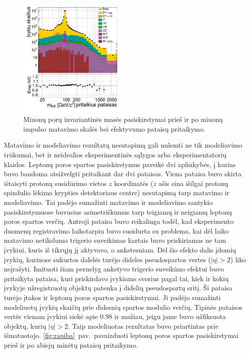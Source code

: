 \documentclass[a4paper, 12pt, oneside]{article}
\begin{document}
\begin{figure}[b!]
	\includegraphics[width=0.48\textwidth]{Kursinis3/mumu_mass_afterSF.png}
	\vspace{-0.5cm}
	\caption{\label{fig:invMba} Miuonų porų invariantinės masės pasiskirstymai prieš ir po miuonų impulso matavimo skalės
	bei efektyvumo pataisų pritaikymo.}
\end{figure}

Matavimo ir modeliavimo rezultatų nesutapimą gali nulemti ne tik modeliavimo trūkumai, bet ir neidealios eksperimentinės sąlygos
arba eksperimentatorių klaidos.
Leptonų poros spartos pasiskirstymus paveikė dvi aplinkybės, į kurias buvo bandoma atsižvelgti pritaikant dar dvi pataisas.
Viena pataisa buvo skirta ištaisyti protonų susidūrimo vietos $z$ koordinatės ($z$ ašis eina išilgai protonų
spindulio lėkimo krypties detektoriaus centre) nesutapimą tarp matavimo ir modeliavimo.
Tai padėjo sumažinti matavimo ir modeliavimo santykio pasiskirstymuose buvusius asimetriškumus tarp teigiamų ir neigiamų leptonų
poros spartos verčių.
Antroji pataisa buvo reikalinga todėl, kad eksperimento duomenų registravimo laikotarpiu buvo susidurta su problema,
kai dėl laiko matavimo netikslumo trigerio suveikimas kartais buvo priskiriamas ne tam įvykiui, kuris iš tikrųjų jį aktyvavo, o
ankstesniam.
Dėl šio efekto dalis įdomių įvykių, kuriuose sukurtos dalelės turėjo dideles pseudospartos vertes ($|\eta|>2$) liko neįrašyti.
Imituoti šiam pernelyg ankstyvo trigerio suveikimo efektui buvo pritaikyta pataisa, kuri priskirdavo įvykiams
svorius pagal tai, kiek ir kokių įvykyje užregistruotų objektų patenka į didelių pseudospartų sritį.
Ši pataisa turėjo įtakos ir leptonų poros spartos pasiskirstymui.
Ji padėjo sumažinti modeliuotų įvykių skaičių prie didesnių spartos modulio verčių.
Tipinės pataisos vertės vienam įvykiui siekė apie $0.98$ ir mažiau, jeigu jame buvo užfiksuota objektų, kurių $|\eta|>2$.
Taip modeliuotas rezultatas buvo priartintas prie išmatuotojo.
\ref{fig:rapiba}~pav.\ pavaizduoti leptonų poros spartos pasiskirstymai prieš ir po abiejų minėtų pataisų pritaikymo.
\end{document}
